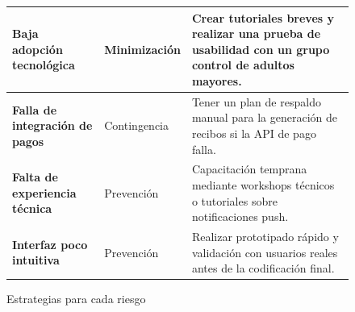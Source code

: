 \begin{figure}[H]
\begin{tabularx}{\textwidth}{|p{5.5cm}|p{2.5cm}|X|}
    \\ \hline
    
            \textbf{Baja adopción tecnológica} 
        
        & 
        
            Minimización 
        
        & 
        
            Crear tutoriales breves y realizar una prueba de usabilidad con un grupo control de adultos mayores. 
        
    \\ \hline
    
            \textbf{Falla de integración de pagos} 
        
        & 
        
            Contingencia 
        
        & 
        
            Tener un plan de respaldo manual para la generación de recibos si la API de pago falla. 
        
    \\ \hline
    
            \textbf{Falta de experiencia técnica} 
        
        & 
        
            Prevención 
        
        & 
        
            Capacitación temprana mediante workshops técnicos o tutoriales sobre notificaciones push. 
        
    \\ \hline
    
            \textbf{Interfaz poco intuitiva} 
        
        & 
        
            Prevención 
        
        & 
        
            Realizar prototipado rápido y validación con usuarios reales antes de la codificación final. 
        
    \\ \hline
    \end{tabularx}
    \caption{Estrategias para cada riesgo}
\end{figure}
